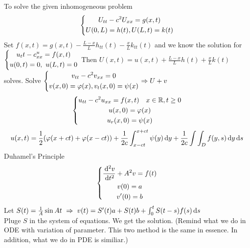 To solve the given inhomogeneous problem
\[\left\{\begin{gathered}U_{tt}-c^2U_{xx}=g(x,t)\\U(0,L)=h(t), U(L,t)=k(t)\end{gathered}\right.
\]
Set $f(x,t)=g(x,t)-\frac{L-x}{L}h_{tt}(t)-\frac{x}{L}k_{tt}(t)$ and we know the solution for $\left\{\begin{gathered}u_tt-c^u_{xx}=f(x,t)\\u(0,t)=0,~u(L,t)=0\end{gathered}\right.$ Then $U(x,t)=u(x,t)+\frac{L-x}{L}h(t)+\frac{x}{L}k(t)$ solves.
Solve $\left\{\begin{gathered}v_{tt}-c^2v_{xx}=0\\v(x,0)=\varphi(x), v_t(x,0)=\psi(x)\end{gathered}\right.\Rightarrow U+v$\\

\[\left\{\begin{gathered}u_{tt}-c^2u_{xx}=f(x,t)\quad x\in\mathbb{R},t\geq0\\u(x,0)=\varphi(x)\\u_r(x,0)=\psi(x)\end{gathered}\right.
\]
\[u(x,t)=\frac{1}{2}(\varphi(x+ct)+\varphi(x-ct))+\frac{1}{2c}\int_{x-ct}^{x+ct}\psi(y)\,\mathrm{d} y+\frac{1}{2c}\int\int_Df(y,s)\,\mathrm{d} y\,\mathrm{d} s
\]
Duhamel's Principle
\[\left\{\begin{gathered}\frac{\,\mathrm{d}^2v}{\,\mathrm{d} t^2}+A^2v=f(t)\\v(0)=a\\v^{\prime}(0)=b\end{gathered}\right.
\]
Let $S(t)=\frac{1}{A}\sin At~\Rightarrow ~v(t)=S^{\prime}(t)a+S(t)b+\int_0^tS(t-s)f(s)\,\mathrm{d} s$\\
Pluge $S$ in the system of equations. We get the solution. (Remind what we do in ODE with variation of parameter. This two method is the same in essence. In addition, what we do in PDE is similiar.)













